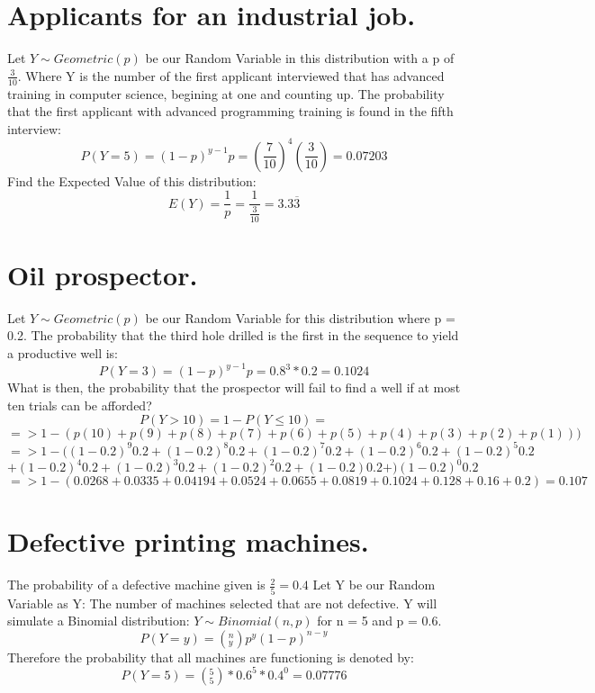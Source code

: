 \documentclass[a4paper, 12pt]{article}
\begin{document}
\section{Applicants for an industrial job.}
Let $Y \sim Geometric(p)$ be our Random Variable in this distribution with a p of $\frac{3}{10}$. Where Y is the number of the first applicant interviewed that has advanced training in computer science, begining at one and counting up.\newline\newline
\indent The probability that the first applicant with advanced programming training is found in the fifth interview: $$P(Y = 5) = (1 - p)^{y-1}p = (\frac{7}{10})^4(\frac{3}{10}) = 0.07203$$
\indent Find the Expected Value of this distribution: $$E(Y) = \frac{1}{p} = \frac{1}{\frac{3}{10}} = 3.3\overline3$$
\section{Oil prospector.}
Let $Y \sim Geometric(p)$ be our Random Variable for this distribution where p = 0.2.\newline
\newline The probability that the third hole drilled is the first in the sequence to yield a productive well is: $$P(Y = 3) = (1-p)^{y-1}p = 0.8^3*0.2 = 0.1024$$
What is then, the probability that the prospector will fail to find a well if at most ten trials can be afforded? 
$$P(Y > 10) = 1 - P(Y \leq 10) = $$ $$=> 1 - (p(10) + p(9)+p(8)+p(7)+p(6)+p(5)+p(4)+p(3)+p(2)+p(1)))$$
$$=> 1 - ((1-0.2)^{9}0.2 + (1-0.2)^{8} 0.2 + (1-0.2)^{7}0.2 + (1-0.2)^{6}0.2 + (1-0.2)^{5}0.2$$$$ + (1-0.2)^{4}0.2 + (1-0.2)^{3}0.2 + (1-0.2)^{2}0.2 + (1-0.2)0.2 + )
(1-0.2)^{0}0.2$$
$$=> 1 - (0.0268 + 0.0335 + 0.04194 + 0.0524 + 0.0655 + 0.0819 + 0.1024 + 0.128 + 0.16 + 0.2) = 0.107$$
\section{Defective printing machines.}
The probability of a defective machine given is $\frac{2}{5} = 0.4$\newline
Let Y be our Random Variable as Y: The number of machines selected that are not defective. Y will simulate a Binomial distribution: $Y \sim Binomial(n, p)$ for n = 5 and p = 0.6.\newline
$$P(Y = y) = (^n_y)p^y(1-p)^{n-y}$$
Therefore the probability that all machines are functioning is denoted by:
$$P(Y = 5) = (^5_5)*0.6^5*0.4^0 = 0.07776$$
\end{document}
